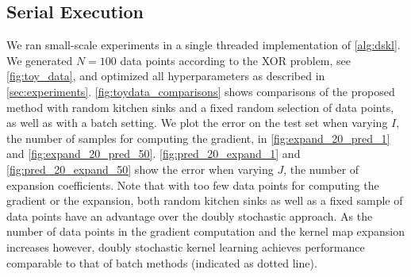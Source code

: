 \documentclass{article} %
\begin{document}
\subsection{Serial Execution}\label{sec:single_host}
We ran small-scale experiments in a single threaded implementation of \autoref{alg:dskl}. We generated $N=100$ data points according to the XOR problem, see \autoref{fig:toy_data}, and optimized all hyperparameters as described in \autoref{sec:experiments}.
%
\autoref{fig:toydata_comparisons} shows comparisons of the proposed method with random kitchen sinks and a fixed random selection of data points, as well as with a batch setting. We plot the error on the test set when varying $I$, the number of samples for computing the gradient, in \autoref{fig:expand_20_pred_1} and \autoref{fig:expand_20_pred_50}. \autoref{fig:pred_20_expand_1} and \autoref{fig:pred_20_expand_50} show the error when varying $J$, the number of expansion coefficients. Note that with too few data points for computing the gradient or the expansion, both random kitchen sinks as well as a fixed sample of data points have an advantage over the doubly stochastic approach. As the number of data points in the gradient computation and the kernel map expansion increases however, doubly stochastic kernel learning achieves performance comparable to that of batch methods (indicated as dotted line).
%
\end{document}
